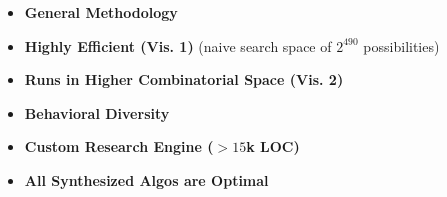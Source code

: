 \begin{frame}{}

\vspace{0.2cm}

\begin{itemize}\setlength\itemsep{0.55cm}
    \item<1-> \textbf{General Methodology}\\
              
    \item<2-> \textbf{Highly Efficient (Vis. 1)} \quad \textcolor{softgray}{\small (naive search space of \textbf{$2^{490}$} possibilities)}\\
              
    \item<3-> \textbf{Runs in Higher Combinatorial Space (Vis. 2)}\\
              
    \item<4-> \textbf{Behavioral Diversity}\\
              
    \item<5-> \textbf{Custom Research Engine ($>15$k LOC)}\\

    \item<6-> \textbf{All Synthesized Algos are Optimal}\\
  
\end{itemize}

\end{frame}
